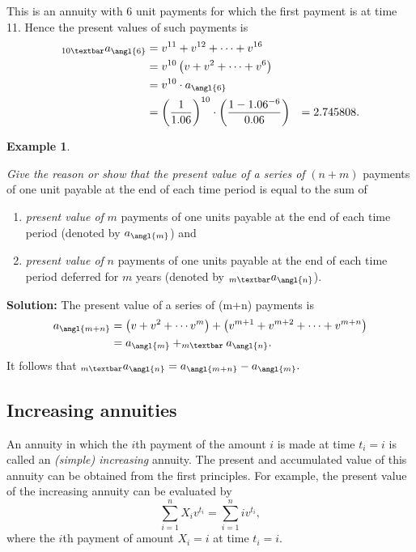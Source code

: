 \documentclass[
]{book}
\theoremstyle{definition}
\theoremstyle{definition}
\newtheorem{example}{Example}[chapter]
\theoremstyle{definition}
\theoremstyle{definition}
\theoremstyle{remark}
\begin{document}
This is an annuity with 6 unit payments for which the first payment is
at time 11. Hence the present values of such payments is
\[\begin{aligned}
    _{10 \textbar}a_\angl{6}
  &= v^{11} + v^{12} + \cdots +v^{16}  \\
    &= v^{10}  \left( v + v^2 + \cdots + v^6  \right) \\
    &= v^{10} \cdot  a_\angl{6} \\
    &= \left(\frac{1}{1.06}\right)^{10} \cdot \left( \frac{1- 1.06^{-6}}{0.06} \right)
    &= 2.745808.\end{aligned}\]

\begin{example}
\protect\hypertarget{exm:unlabeled-div-34}{}\label{exm:unlabeled-div-34}

\emph{Give the reason or show that the present value of a series of} \((n+m)\)
payments of one unit payable at the end of each time period is equal to
the sum of

\begin{enumerate}
\def\labelenumi{\arabic{enumi}.}
\item
  \emph{present value of} \(m\) payments of one units payable at the end of
  each time period (denoted by \(a_\angl{m}\)) and
\item
  \emph{present value of} \(n\) payments of one units payable at the end of
  each time period deferred for \(m\) years (denoted by
  \(_{m \textbar}a_\angl{n}\)).
\end{enumerate}

\end{example}

\textbf{Solution:} The present value of a series of (m+n) payments is
\[\begin{aligned}
a_\angl{m+n} &=  \left( v + v^2 + \cdots  v^m\right) + \left( v^{m+1} + v^{m+2} + \cdots +v^{m+n} \right) \\
&= a_\angl{m} + _{m \textbar}a_\angl{n}.\end{aligned}\] It follows that
\(_{m \textbar}a_\angl{n} = a_\angl{m+n} - a_\angl{m}.\)

\hypertarget{increasing-annuities}{%
\subsection{Increasing annuities}\label{increasing-annuities}}

An annuity in which the \(i\)th payment of the amount \(i\) is made at time
\(t_i = i\) is called an \emph{(simple) increasing} annuity. The present and
accumulated value of this annuity can be obtained from the first
principles. For example, the present value of the increasing annuity can
be evaluated by \[\sum_{i=1}^n X_i v^{t_i} = \sum_{i=1}^n i v^{t_i},\]
where the \(i\)th payment of amount \(X_i = i\) at time \(t_i = i\).
\end{document}

